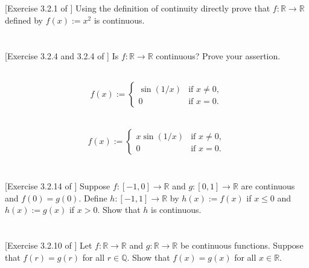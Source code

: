 \documentclass[11pt,letterpaper]{article}
\begin{document}
\section{} [Exercise 3.2.1 of \cite{Lebl_23}] 
Using the definition of continuity directly prove that $f: \mathbb{R}\to \mathbb{R}$ defined by $f(x) := x^2$ is continuous.

\section{} [Exercise 3.2.4 and 3.2.4 of \cite{Lebl_23}] 
Is $f: \mathbb{R}\to \mathbb{R}$ continuous? Prove your assertion.

\subsection{}
\begin{align}
    f(x) := \begin{cases}
        \sin(1/x) &\text{if } x\neq 0,\\
        0  &\text{if } x= 0.
    \end{cases}
\end{align}

\subsection{}
\begin{align}
    f(x) := \begin{cases}
        x\sin(1/x) &\text{if } x\neq 0,\\
        0  &\text{if } x= 0.
    \end{cases}
\end{align}

\section{} [Exercise 3.2.14 of \cite{Lebl_23}] 
Suppose $f:[-1,0]\to \mathbb{R}$ and $g:[0,1]\to \mathbb{R}$ are continuous and $f(0)=g(0)$. Define $h:[-1,1]\to \mathbb{R}$ by $h(x) := f(x)$ if $x\leq 0$ and $h(x):= g(x)$ if $x>0$. Show that $h$ is continuous.

\section{} [Exercise 3.2.10 of \cite{Lebl_23}] 
Let $f:\mathbb{R}\to \mathbb{R}$ and $g:\mathbb{R}\to \mathbb{R}$ be continuous functions. Suppose that $f(r)=g(r)$ for all $r\in\mathbb{Q}$. Show that $f(x)=g(x)$ for all $x\in\mathbb{R}$. 
\end{document}

